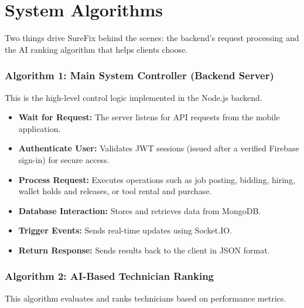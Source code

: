 \documentclass[A4paper,12pt]{report}
\theoremstyle{plain}
\theoremstyle{definition}
\theoremstyle{remark}
\numberwithin{equation}{section}
\begin{document}
\section{System Algorithms}

Two things drive SureFix behind the scenes: the backend's request processing and the AI ranking algorithm that helps clients choose.

\subsubsection{Algorithm 1: Main System Controller (Backend Server)}

This is the high-level control logic implemented in the Node.js backend.

\begin{itemize}
    \item \textbf{Wait for Request:} The server listens for API requests from the mobile application.
    
        \item \textbf{Authenticate User:} Validates JWT sessions (issued after a verified Firebase sign-in) for secure access.
    
        \item \textbf{Process Request:} Executes operations such as job posting, bidding, hiring, wallet holds and releases, or tool rental and purchase.
    
    \item \textbf{Database Interaction:} Stores and retrieves data from MongoDB.
    
    \item \textbf{Trigger Events:} Sends real-time updates using Socket.IO.
    
    \item \textbf{Return Response:} Sends results back to the client in JSON format.
\end{itemize}

\subsubsection{Algorithm 2: AI-Based Technician Ranking}

This algorithm evaluates and ranks technicians based on performance metrics.
\end{document}
